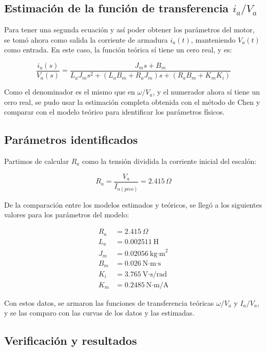 \documentclass{article}
\begin{document}
\subsection*{Estimación de la función de transferencia \texorpdfstring{$i_a/V_a$}{ia/Va}}
Para tener una segunda ecuación y así poder obtener los parámetros del motor, se tomó ahora como salida la corriente de armadura $i_a(t)$, manteniendo $V_a(t)$ como entrada. En este caso, la función teórica sí tiene un cero real, y es:

\begin{equation}
    \frac{i_a(s)}{V_a(s)} = \frac{J_m s + B_m}{L_a J_m s^2 + (L_a B_m + R_a J_m) s + (R_a B_m + K_m K_i)}
\end{equation}

Como el denominador es el mismo que en $\omega/V_a$, y el numerador ahora sí tiene un cero real, se pudo usar la estimación completa obtenida con el método de Chen y comparar con el modelo teórico para identificar los parámetros físicos.

\subsection*{Parámetros identificados}
Partimos de calcular $R_a$ como la tensión dividida la corriente inicial del escalón:

$$R_a = \frac{V_a}{I_{a(pico)}} =2.415 \, \Omega$$ 

De la comparación entre los modelos estimados y teóricos, se llegó a los siguientes valores para los parámetros del modelo:

\begin{align*}
    R_a &= 2.415\ \Omega \\
    L_a &= 0.002511\ \text{H} \\
    J_m &= 0.02056\ \text{kg·m}^2 \\
    B_m &= 0.026\ \text{N·m·s} \\
    K_i &= 3.765\ \text{V·s/rad} \\
    K_m &= 0.2485\ \text{N·m/A}
\end{align*}

Con estos datos, se armaron las funciones de transferencia teóricas $\omega/V_a$ y $I_a/V_a$, y se las comparo con las curvas de los datos y las estimadas.

\subsection*{Verificación y resultados}
\end{document}
